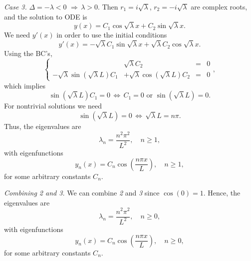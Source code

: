 \documentclass[11pt]{article}
\begin{document}
\begin{solution}
\par \textsl{Case 3.} $\Delta = -\lambda <0 \,\, \Rightarrow \, \lambda>0.$ Then $r_{1}=i\sqrt{\lambda}$, $r_{2}=-i\sqrt{\lambda}$ are complex roots, and the solution to ODE is
\[y(x)=C_{1}\cos\sqrt{\lambda}x+C_{2}\sin\sqrt{\lambda}x.\]
We need $y'(x)$ in order to use the initial conditions
\[y'(x)=-\sqrt{\lambda}C_{1}\sin\sqrt{\lambda}x+\sqrt{\lambda}C_{2}\cos\sqrt{\lambda}x.\]
Using the BC's,
\begin{equation*}
\left\{\begin{array}{rrcc}
        & \sqrt{\lambda}C_{2} & = & 0\\
       -\sqrt{\lambda}\sin(\sqrt{\lambda}L)C_{1} &+ \sqrt{\lambda}\cos(\sqrt{\lambda}L)C_{2}&=&0
      \end{array}\right. ,
\end{equation*}
which implies 
\[\sin(\sqrt{\lambda}L)C_{1}=0 \,\Leftrightarrow\, C_{1} = 0 \text{ or } \sin(\sqrt{\lambda}L)=0.\]
For nontrivial solutions we need 
\[\sin(\sqrt{\lambda}L)=0 \,\Leftrightarrow \, \sqrt{\lambda}L=n\pi.\] 
Thus, the eigenvalues are
\[\boxed{\lambda_{n}=\frac{n^{2}\pi^{2}}{L^{2}}}, \quad n\geq 1,\]
with eigenfunctions
\[\boxed{y_{n}(x)=C_{n}\cos\left( \frac{n \pi x}{L} \right)}, \quad n\geq 1,\]
for some arbitrary constants $C_{n}$.

\textsl{Combining 2 and 3.} We can combine \textsl{2} and \textsl{3} since $\cos(0)=1$. Hence, the eigenvalues are
\[\boxed{\lambda_{n}=\frac{n^{2}\pi^{2}}{L^{2}}}, \quad n\geq 0,\]
with eigenfunctions
\[\boxed{y_{n}(x)=C_{n}\cos\left( \frac{n \pi x}{L} \right)}, \quad n\geq 0,\]
for some arbitrary constants $C_{n}$.
\end{solution}
\end{document}
